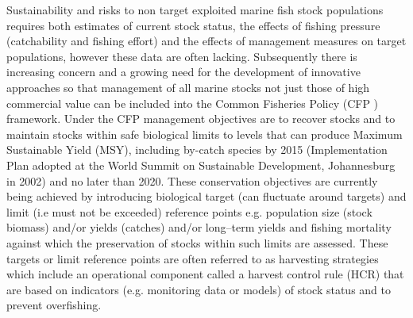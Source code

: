 \documentclass[preprint,12pt]{elsarticle}
\begin{document}
Sustainability and risks to non target exploited marine fish stock populations requires both estimates of current stock status, the effects of fishing pressure (catchability and fishing effort) and the effects of management measures on target populations, however these data are often lacking.  Subsequently there is increasing concern and a growing need for the development of innovative approaches so that management of all marine stocks not just those of high commercial value can be included into the Common Fisheries Policy (CFP \cite{european2013regulation}) framework. Under the CFP management objectives are to recover stocks and to maintain stocks within safe biological limits to levels that can produce Maximum Sustainable Yield (MSY), including by-catch species by 2015 (Implementation Plan adopted at the World Summit on Sustainable Development, Johannesburg in 2002) and no later than 2020. These conservation objectives are currently being achieved by introducing biological target (can fluctuate around targets) and limit (i.e must not be exceeded) reference points e.g. population size (stock biomass) and/or yields (catches) and/or long–term yields and fishing mortality against which the preservation of stocks within such limits are assessed. These targets or limit reference points are often referred to as harvesting strategies which include an operational component called a harvest control rule (HCR) that are based on indicators (e.g. monitoring data or models) of stock status and to prevent overfishing. 
\end{document}
